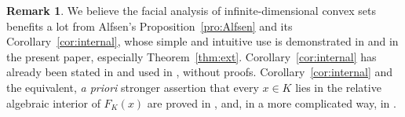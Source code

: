 \documentclass[a4paper,11pt,reqno]{amsart}
\numberwithin{equation}{section}
\theoremstyle{plain}
\theoremstyle{definition}
\newtheorem{remark}[theorem]{Remark}
\begin{document}
%
\begin{remark}\label{rem:x-internal-gen-x}
We believe the facial analysis of infinite-dimensional convex sets benefits a lot from
Alfsen's Proposition~\ref{pro:Alfsen} and its Corollary~\ref{cor:internal}, whose simple 
and intuitive use is demonstrated in \cite{weis25} and in the present paper, especially
Theorem~\ref{thm:ext}. Corollary~\ref{cor:internal} has already been stated in 
\cite[Proposition~2.3 (5)]{garcia-pacheco20} and used in 
\cite[Corollary~3.6]{millan-roshchina23}, without proofs. 
Corollary~\ref{cor:internal} and the equivalent, \emph{a priori} stronger assertion that 
every $x\in K$ lies in the relative algebraic interior of $F_K(x)$ are proved in 
\cite[Section~4]{weis25}, and, in a more complicated way, in 
\cite[Theorem 2.3]{weis-shirokov21}.
\end{remark}
%
%
\end{document}
